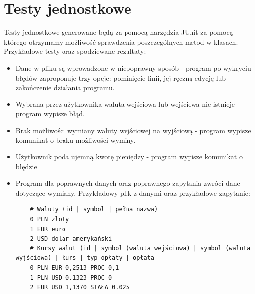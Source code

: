 ﻿\documentclass[12pt]{article}
\begin{document}
\section{Testy jednostkowe}
Testy jednostkowe generowane będą za pomocą narzędzia JUnit za pomocą którego otrzymamy możliwość sprawdzenia poszczególnych metod w klasach. Przykładowe testy oraz spodziewane rezultaty:
\begin{itemize}
    \item Dane w pliku są wprowadzone w niepoprawny sposób - program po wykryciu błędów zaproponuje trzy opcje: pominięcie linii, jej ręczną edycję lub zakończenie działania programu.
    \item Wybrana przez użytkownika waluta wejściowa lub wejściowa nie istnieje - program wypisze błąd.
    \item Brak możliwości wymiany waluty wejściowej na wyjściową - program wypisze komunikat o braku możliwości wyminy.
    \item Użytkownik poda ujemną kwotę pieniędzy - program wypisze komunikat o błędzie
    \item Program dla poprawnych danych oraz poprawnego zapytania zwróci dane dotyczące wymiany. Przykładowy plik z danymi oraz przykładowe zapytanie:
    \begin{scriptsize}{\begin{verbatim}
    # Waluty (id | symbol | pełna nazwa)
    0 PLN zloty
    1 EUR euro
    2 USD dolar amerykański
    # Kursy walut (id | symbol (waluta wejściowa) | symbol (waluta wyjściowa) | kurs | typ opłaty | opłata
    0 PLN EUR 0,2513 PROC 0,1
    1 PLN USD 0.1323 PROC 0
    2 EUR USD 1,1370 STAŁA 0.025
    

\end{verbatim}}
\end{scriptsize}
\end{itemize}
\end{document}
